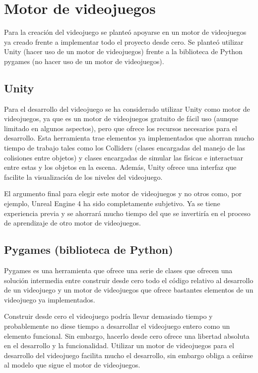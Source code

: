 
\section{Motor de videojuegos}
Para la creación del videojuego se planteó apoyarse en un motor de videojuegos ya creado frente a implementar todo el proyecto desde cero. Se planteó utilizar Unity (hacer uso de un motor de videojuegos) frente a la biblioteca de Python pygames (no hacer uso de un motor de videojuegos).

\subsection{Unity}
Para el desarrollo del videojuego se ha considerado utilizar Unity como motor de videojuegos, ya que es un motor de videojuegos gratuito de fácil uso (aunque limitado en algunos aspectos), pero que ofrece los recursos necesarios para el desarrollo. Esta herramienta trae elementos ya implementados que ahorran mucho tiempo de trabajo tales como los Colliders (clases encargadas del manejo de las colisiones entre objetos) y clases encargadas de simular las físicas e interactuar entre estas y los objetos en la escena. Además, Unity ofrece una interfaz que facilite la visualización de los niveles del videojuego.

El argumento final para elegir este motor de videojuegos y no otros como, por ejemplo, Unreal Engine 4 ha sido completamente subjetivo. Ya se tiene experiencia previa y se ahorrará mucho tiempo del que se invertiría en el proceso de aprendizaje de otro motor de videojuegos.

\subsection{Pygames (biblioteca de Python)}
Pygames es una herramienta que ofrece una serie de clases que ofrecen una solución intermedia entre construir desde cero todo el código relativo al desarrollo de un videojuego y un motor de videojuegos que ofrece bastantes elementos de un videojuego ya implementados. 

Construir desde cero el videojuego podría llevar demasiado tiempo y probablemente no diese tiempo a desarrollar el videojuego entero como un elemento funcional. Sin embargo, hacerlo desde cero ofrece una libertad absoluta en el desarrollo y la funcionalidad.
Utilizar un motor de videojuegos para el desarrollo del videojuego facilita mucho el desarrollo, sin embargo obliga a ceñirse al modelo que sigue el motor de videojuegos.

